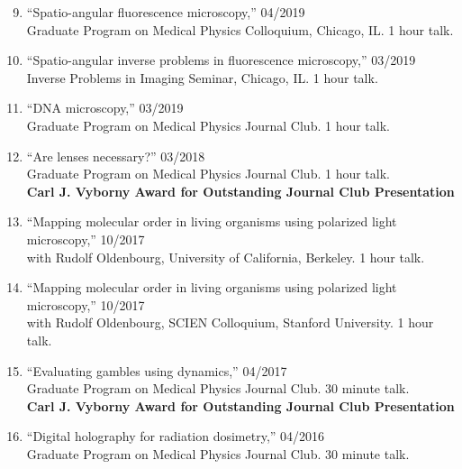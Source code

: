 \documentclass[12pt,letterpaper]{article}
\newenvironment{benumerate}[1]{
    \let\oldItem\item
    \def\item{\addtocounter{enumi}{-2}\oldItem}
    \begin{enumerate}[labelsep=0.0125\textwidth, align=left]
    \setcounter{enumi}{#1}
    \addtocounter{enumi}{1}
}{
    \end{enumerate}
  }
\begin{document}
\begin{benumerate}{8}
\item {``Spatio-angular fluorescence microscopy,'' \hfill 04/2019\\
     Graduate Program on Medical Physics Colloquium, Chicago, IL. 1 hour talk.}
  
\item {``Spatio-angular inverse problems in fluorescence microscopy,'' \hfill 03/2019\\
     Inverse Problems in Imaging Seminar, Chicago, IL. 1 hour talk.}

\item {``DNA microscopy,'' \hfill 03/2019\\
    Graduate Program on Medical Physics Journal Club. 1 hour talk.}
  
\item {``Are lenses necessary?'' \hfill 03/2018\\
    Graduate Program on Medical Physics Journal Club. 1 hour talk.\\
    \textbf{Carl J. Vyborny Award for Outstanding Journal Club Presentation}  }
  
\item {``Mapping molecular order in living organisms using polarized light microscopy,'' \hfill 10/2017\\
    with Rudolf Oldenbourg, University of California, Berkeley. 1 hour talk.}
  
\item {``Mapping molecular order in living organisms using polarized light microscopy,'' \hfill 10/2017\\
    with Rudolf Oldenbourg, SCIEN Colloquium, Stanford University. 1 hour talk.}
  
\item {``Evaluating gambles using dynamics,'' \hfill 04/2017\\
    Graduate Program on Medical Physics Journal Club. 30 minute talk.\\
    \textbf{Carl J. Vyborny Award for Outstanding Journal Club Presentation}}

\item {``Digital holography for radiation dosimetry,'' \hfill 04/2016\\
    Graduate Program on Medical Physics Journal Club. 30 minute talk.}
\end{benumerate}
\end{document}
